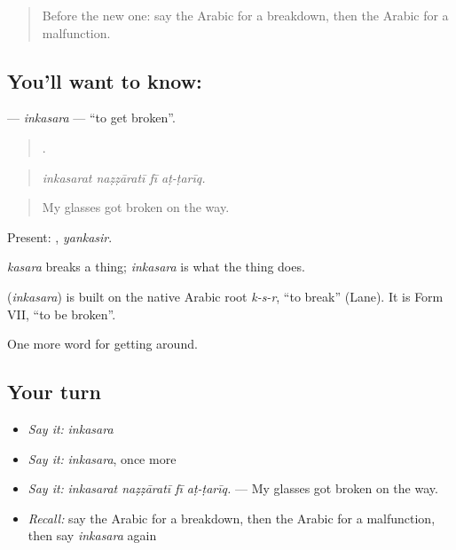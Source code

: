 \begin{quote}
Before the new one: say the Arabic for a breakdown, then the Arabic for a malfunction.
\end{quote}

\subsection*{You'll want to know: }
\textbf{} — \emph{inkasara} — \textquotedblleft{}to get broken\textquotedblright{}.

\begin{quote}
   .
\end{quote}

\begin{quote}
\emph{inkasarat naẓẓāratī fī aṭ-ṭarīq.}
\end{quote}

\begin{quote}
My glasses got broken on the way.
\end{quote}

Present: , \emph{yankasir}.

\emph{kasara} breaks a thing; \emph{inkasara} is what the thing does.

\begin{cousinweb}
\textbf{} (\emph{inkasara}) is built on the native Arabic root \emph{k-s-r}, \textquotedblleft{}to break\textquotedblright{} (Lane). It is Form VII, \textquotedblleft{}to be broken\textquotedblright{}.
\end{cousinweb}

\begin{grammarlens}[title={What you've built}]
One more word for getting around.
\end{grammarlens}

\subsection*{Your turn}
\begin{itemize}
\raggedright
  \item \emph{Say it:} \emph{inkasara}
  \item \emph{Say it:} \emph{inkasara}, once more
  \item \emph{Say it:} \emph{inkasarat naẓẓāratī fī aṭ-ṭarīq.} — My glasses got broken on the way.
  \item \emph{Recall:} say the Arabic for a breakdown, then the Arabic for a malfunction, then say \emph{inkasara} again
\end{itemize}

